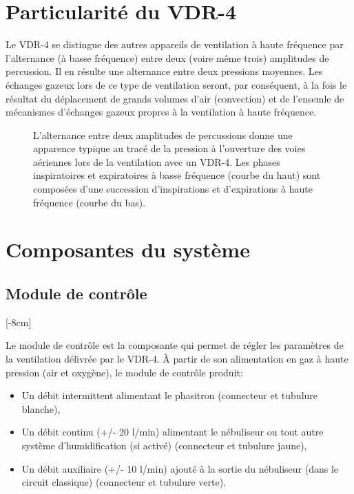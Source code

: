 \section{Particularité du VDR-4}
\label{sec:particularite}
Le VDR-4 se distingue des autres appareils de ventilation à haute
fréquence par l'alternance (à basse fréquence) entre deux (voire même
trois) amplitudes de percussion. Il en résulte une alternance entre
deux pressions moyennes. Les échanges gazeux lors de ce type de
ventilation seront, par conséquent, à la fois le résultat du
déplacement de grands volumes d'air (convection) et de l'ensemle de
mécanismes d'échanges gazeux propres à la ventilation à haute
fréquence.

\begin{figure}
	\begin{wide}
	
	\caption[Tracé pression - temps typique.]{L'alternance entre deux
	amplitudes de percussions donne une apparence typique au tracé de la
	pression à l'ouverture des voies aériennes lors de la ventilation
	avec un VDR-4. Les phases inspiratoires et expiratoires à basse
	fréquence (courbe du haut) sont composées d'une succession
	d'inspirations et d'expirations à haute fréquence (courbe du bas).}
	\end{wide}
\end{figure}

\section{Composantes du système}

\subsection{Module de contrôle}

[-8cm]

Le module de contrôle est la composante qui permet de régler les
paramètres de la ventilation délivrée par le VDR-4.  À partir de son
alimentation en gaz à haute pression (air et oxygène), le module de
contrôle produit:

\begin{itemize}
	\item Un débit intermittent alimentant le phasitron (connecteur et
		tubulure blanche),
	\item Un débit continu (+/- 20 l/min) alimentant
		le nébuliseur ou tout autre système d'humidification (si activé)
		(connecteur et tubulure jaune),
	\item Un débit auxiliaire (+/- 10 l/min) ajouté à la sortie du
		nébuliseur (dans le circuit classique) (connecteur et tubulure
		verte).
\end{itemize}


